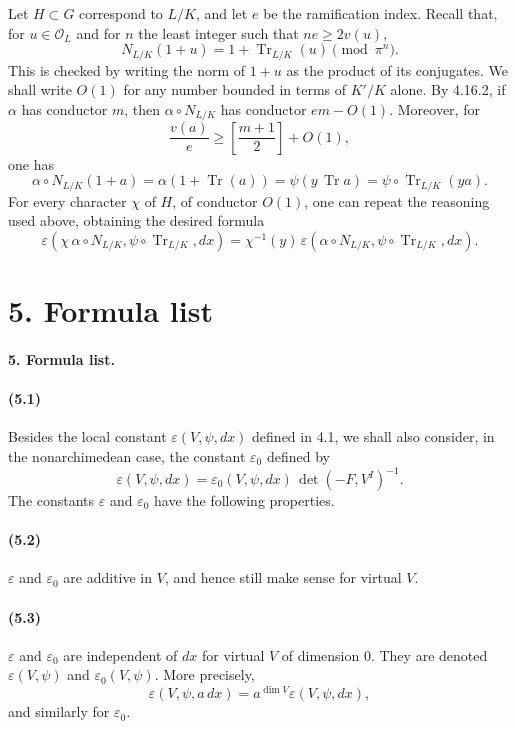 \documentclass[10pt,letterpaper]{article}
\newcommand{\Tr}{\operatorname{Tr}}
\providecommand{\Tr}{\operatorname{Tr}}
\providecommand{\Tr}{\operatorname{Tr}}
\providecommand{\Tr}{\operatorname{Tr}}
\begin{document}
Let \(H\subset G\) correspond to \(L/K\), and let \(e\) be the ramification index. Recall that, for \(u\in\mathcal O_L\) and for \(n\) the least integer such that \(ne\ge2v(u)\),
\[
\tag{4.16.2}
N_{L/K}(1+u)=1+\Tr_{L/K}(u)\pmod{\pi^n}.
\]
This is checked by writing the norm of \(1+u\) as the product of its conjugates. We shall write \(O(1)\) for any number bounded in terms of \(K'/K\) alone. By 4.16.2, if \(\alpha\) has conductor \(m\), then \(\alpha\circ N_{L/K}\) has conductor \(em-O(1)\). Moreover, for
\[
\frac{v(a)}e\ge \left[\frac{m+1}{2}\right]+O(1),
\]
one has
\[
\alpha\circ N_{L/K}(1+a)
=
\alpha(1+\Tr(a))
=
\psi(y\,\Tr a)
=
\psi\circ\Tr_{L/K}(ya).
\]
For every character \(\chi\) of \(H\), of conductor \(O(1)\), one can repeat the reasoning used above, obtaining the desired formula
\[
\varepsilon(\chi\,\alpha\circ N_{L/K},\psi\circ\Tr_{L/K},dx)
=
\chi^{-1}(y)\,
\varepsilon(\alpha\circ N_{L/K},\psi\circ\Tr_{L/K},dx).
\]

\section*{5. Formula list}

\paragraph{5. Formula list.}

\paragraph{(5.1)} Besides the local constant \(\varepsilon(V,\psi,dx)\) defined in 4.1, we shall also consider, in the nonarchimedean case, the constant \(\varepsilon_0\) defined by
\[
\varepsilon(V,\psi,dx)
=
\varepsilon_0(V,\psi,dx)\,\det(-F,V^I)^{-1}.
\]
The constants \(\varepsilon\) and \(\varepsilon_0\) have the following properties.

\paragraph{(5.2)} \(\varepsilon\) and \(\varepsilon_0\) are additive in \(V\), and hence still make sense for virtual \(V\).

\paragraph{(5.3)} \(\varepsilon\) and \(\varepsilon_0\) are independent of \(dx\) for virtual \(V\) of dimension \(0\). They are denoted \(\varepsilon(V,\psi)\) and \(\varepsilon_0(V,\psi)\). More precisely,
\[
\varepsilon(V,\psi,a\,dx)=a^{\dim V}\varepsilon(V,\psi,dx),
\]
and similarly for \(\varepsilon_0\).
\end{document}
